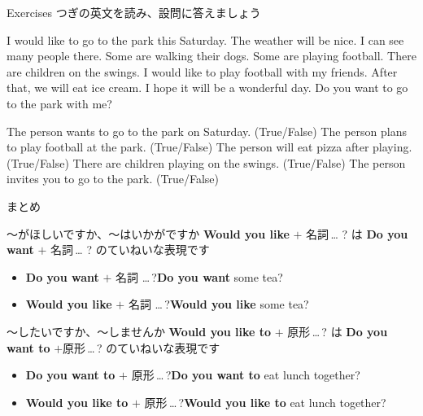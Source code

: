 \documentclass[aspectratio=169,xcolor={dvipsnames,table}]{beamer}
\begin{document}
\begin{frame}[plain]{Exercises}
つぎの英文を読み、設問に答えましょう
 \begin{tcolorbox}[colframe=NavyBlue!20,
  colback=NavyBlue!10!white,
  colbacktitle=NavyBlue!40!white,
  coltitle=black, fonttitle=\bfseries,
  title=A Day at the Park]
I would like to go to the park this Saturday. The weather will be nice. I can see many people there. Some are walking their dogs. Some are playing football. There are children on the swings. I would like to play football with my friends. After that, we will eat ice cream. I hope it will be a wonderful day. Do you want to go to the park with me?
\end{tcolorbox}
The person wants to go to the park on Saturday. (True/False)
The person plans to play football at the park. (True/False)
The person will eat pizza after playing. (True/False)
There are children playing on the swings. (True/False)
The person invites you to go to the park. (True/False)

\end{frame}
\begin{frame}[plain]{まとめ}
\begin{block}{～がほしいですか、～はいかがですか}\small
\textbf{Would you like} $+$ 名詞\,\ldots\,\,?\,\,は\,\,\textbf{Do you want} $+$ 名詞\,\ldots\,\,?\,\,のていねいな表現です
\begin{itemize}[square]\small
 \item \textbf{Do you want} $+$ 名詞 \ldots\,?\hfill{\scriptsize \textbf{Do you want} some tea?}
 \item \textbf{Would you like} $+$ 名詞 \ldots\,?\hfill{\scriptsize \textbf{Would you like} some tea?}
       \end{itemize}
\end{block}

\begin{block}{～したいですか、～しませんか}\small
\textbf{Would you like to} $+$ 原形\,\ldots\,?\,\,は\,\,\textbf{Do you want to} $+$原形\,\ldots\,?\,\,のていねいな表現です
\begin{itemize}[square]\small
 \item \textbf{Do you want to} $+$ 原形\,\ldots\,?\hfill{\scriptsize \textbf{Do you want to} eat lunch together?}
 \item \textbf{Would you like to} $+$ 原形\,\ldots\,?\hfill{\scriptsize \textbf{Would you like to} eat lunch together?}
       \end{itemize}
\end{block}
\end{frame}
\end{document}
